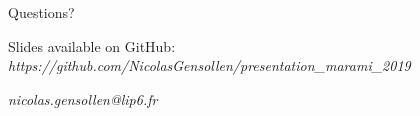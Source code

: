 \documentclass{beamer}
\begin{document}

\begin{frame}
	\Huge{\centerline{Questions?}}
	\bigskip
	{\normalsize Slides available on GitHub: \\ \textit{https://github.com/NicolasGensollen/presentation\_marami\_2019}}
	\bigskip	
	\begin{center}
	{\normalsize \textit{nicolas.gensollen@lip6.fr}}
	\end{center}
\end{frame}

\end{document}
